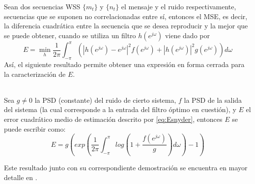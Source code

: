 Sean dos secuencias WSS $\{ m_t\}$ y $\{ n_t\}$ el mensaje y el ruido respectivamente, secuencias que se suponen no correlacionadas entre s\'i, entonces el MSE, es decir, la diferencia cuadr\'atica entre la secuencia que se desea reproducir y la mejor que se puede obtener, cuando se utiliza un filtro $h(e^{j\omega})$ viene dado por
\begin{equation}\label{eq:Esnyder}
E = \min_{h}{\frac{1}{2\pi}\int_{-\pi}^{\pi}{\left(|h(e^{j\omega})-e^{j\omega}|^2f(e^{j\omega})+|h(e^{j\omega})|^2g(e^{j\omega})\right)d\omega}}
\end{equation}
As\'i, el siguiente resultado permite obtener una expresi\'on en forma cerrada para la caracterizaci\'on de $E$.
\begin{lema}\label{lema:snyder}{\ \\}
Sea $g\neq 0$ la PSD (constante) del ruido de cierto sistema, $f$ la PSD de la salida del sistema (la cual corresponde a la entrada del filtro \'optimo en cuesti\'on), y $E$ el error cuadr\'atico medio de estimaci\'on descrito por \eqref{eq:Esnyder}, entonces $E$ se puede escribir como:
\begin{equation}
E=g\left( exp \left( \frac{1}{2\pi}\int_{-\pi}^{\pi}{log\left(1+\frac{f(e^{j\omega})}{g}\right)d\omega}\right)-1\right)
\end{equation}

\end{lema}
Este resultado junto con su correspondiente demostraci\'on se encuentra en mayor detalle en \cite{snyder72-ams}.

